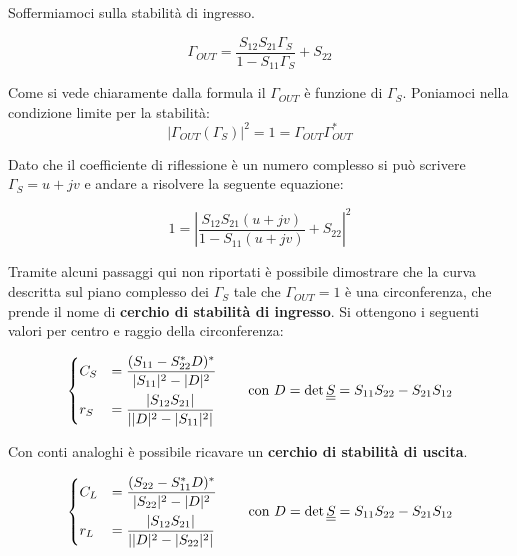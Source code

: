Soffermiamoci sulla stabilità di ingresso.

\[\Gamma_{OUT} = \frac{S_{12}S_{21} \Gamma_S}{1-S_{11}\Gamma_S}+S_{22}\]

Come si vede chiaramente dalla formula il $\Gamma_{OUT}$ è funzione di $\Gamma_S$. Poniamoci nella condizione limite per la stabilità:
\[|\Gamma_{OUT}(\Gamma_S)|^2 = 1 = \Gamma_{OUT}\Gamma_{OUT}^*  \]

Dato che il coefficiente di riflessione è un numero complesso si può scrivere $\Gamma_S = u + jv$ e andare a risolvere la seguente equazione:

\[ 1 = \left| \frac{S_{12}S_{21} (u+jv)}{1-S_{11}(u+jv)}+S_{22} \right| ^2\]

Tramite alcuni passaggi qui non riportati è possibile dimostrare che la curva descritta sul piano complesso dei $\Gamma_S$ tale che $\Gamma_{OUT} = 1$ è una circonferenza, che prende il nome di \textbf{cerchio di stabilità di ingresso}. Si ottengono i seguenti valori per centro e raggio della circonferenza:


\begin{equation}
\begin{dcases}
C_S &= \frac{(S_{11} - S_{22}^*D)^*}{|S_{11}|^2 - |D|^2}\\
r_S &= \frac{|S_{12}S_{21}|}{||D|^2 - |S_{11}|^2|}\\
\end{dcases}
\qquad
\mbox{con } D = \det \underline{\underline{S}} = S_{11} S_{22} - S_{21} S_{12}
\end{equation}

Con conti analoghi è possibile ricavare un \textbf{cerchio di stabilità di uscita}. 

\begin{equation}
\begin{dcases}
C_L &= \frac{(S_{22} - S_{11}^*D)^*}{|S_{22}|^2 - |D|^2}\\
r_L &= \frac{|S_{12}S_{21}|}{||D|^2 - |S_{22}|^2|}\\
\end{dcases}
\qquad
\mbox{con } D = \det \underline{\underline{S}} = S_{11} S_{22} - S_{21} S_{12}
\end{equation}

